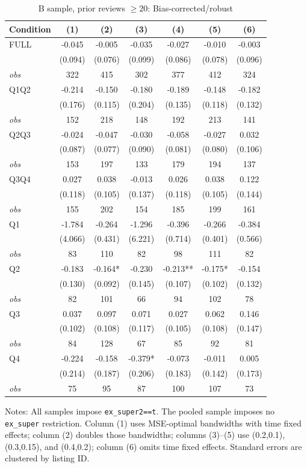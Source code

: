 \begin{table}[!htbp]
\centering
\caption{B sample, prior reviews $\geq20$: Bias-corrected/robust}
\begin{tabular}{lcccccc}
\toprule
Condition & (1) & (2) & (3) & (4) & (5) & (6) \\
\midrule
FULL & -0.045 & -0.005 & -0.035 & -0.027 & -0.010 & -0.003 \\
 & (0.094) & (0.076) & (0.099) & (0.086) & (0.078) & (0.096) \\
\textit{obs} & 322 & 415 & 302 & 377 & 412 & 324 \\
Q1Q2 & -0.214 & -0.150 & -0.180 & -0.189 & -0.148 & -0.182 \\
 & (0.176) & (0.115) & (0.204) & (0.135) & (0.118) & (0.132) \\
\textit{obs} & 152 & 218 & 148 & 192 & 213 & 141 \\
Q2Q3 & -0.024 & -0.047 & -0.030 & -0.058 & -0.027 & 0.032 \\
 & (0.087) & (0.077) & (0.090) & (0.081) & (0.080) & (0.106) \\
\textit{obs} & 153 & 197 & 133 & 179 & 194 & 137 \\
Q3Q4 & 0.027 & 0.038 & -0.013 & 0.026 & 0.038 & 0.122 \\
 & (0.118) & (0.105) & (0.137) & (0.118) & (0.105) & (0.144) \\
\textit{obs} & 155 & 202 & 154 & 185 & 199 & 161 \\
Q1 & -1.784 & -0.264 & -1.296 & -0.396 & -0.266 & -0.384 \\
 & (4.066) & (0.431) & (6.221) & (0.714) & (0.401) & (0.566) \\
\textit{obs} & 83 & 110 & 82 & 98 & 111 & 82 \\
Q2 & -0.183 & -0.164* & -0.230 & -0.213** & -0.175* & -0.154 \\
 & (0.130) & (0.092) & (0.145) & (0.107) & (0.102) & (0.132) \\
\textit{obs} & 82 & 101 & 66 & 94 & 102 & 78 \\
Q3 & 0.037 & 0.097 & 0.071 & 0.027 & 0.062 & 0.146 \\
 & (0.102) & (0.108) & (0.117) & (0.105) & (0.108) & (0.147) \\
\textit{obs} & 84 & 128 & 67 & 85 & 92 & 81 \\
Q4 & -0.224 & -0.158 & -0.379* & -0.073 & -0.011 & 0.005 \\
 & (0.214) & (0.187) & (0.206) & (0.183) & (0.142) & (0.173) \\
\textit{obs} & 75 & 95 & 87 & 100 & 107 & 73 \\
\bottomrule
\end{tabular}
\begin{minipage}{0.98\textwidth}\footnotesize
Notes: All samples impose \texttt{ex\_super2==t}. The pooled sample imposes no \texttt{ex\_super} restriction. Column (1) uses MSE-optimal bandwidths with time fixed effects; column (2) doubles those bandwidths; columns (3)--(5) use (0.2,0.1), (0.3,0.15), and (0.4,0.2); column (6) omits time fixed effects. Standard errors are clustered by listing ID.
\end{minipage}
\end{table}

